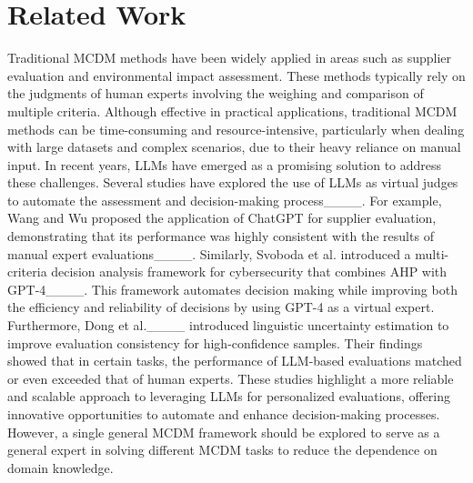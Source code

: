 \section{Related Work}
Traditional MCDM methods have been widely applied in areas such as supplier evaluation and environmental impact assessment. These methods typically rely on the judgments of human experts involving the weighing and comparison of multiple criteria. Although effective in practical applications, traditional MCDM methods can be time-consuming and resource-intensive, particularly when dealing with large datasets and complex scenarios, due to their heavy reliance on manual input. In recent years, LLMs have emerged as a promising solution to address these challenges. Several studies have explored the use of LLMs as virtual judges to automate the assessment and decision-making process____. For example, Wang and Wu proposed the application of ChatGPT for supplier evaluation, demonstrating that its performance was highly consistent with the results of manual expert evaluations____. Similarly, Svoboda et al. introduced a multi-criteria decision analysis framework for cybersecurity that combines AHP with GPT-4____. This framework automates decision making while improving both the efficiency and reliability of decisions by using GPT-4 as a virtual expert. Furthermore, Dong et al.____ introduced linguistic uncertainty estimation to improve evaluation consistency for high-confidence samples. Their findings showed that in certain tasks, the performance of LLM-based evaluations matched or even exceeded that of human experts. These studies highlight a more reliable and scalable approach to leveraging LLMs for personalized evaluations, offering innovative opportunities to automate and enhance decision-making processes. However, a single general MCDM framework should be explored to serve as a general expert in solving different MCDM tasks to reduce the dependence on domain knowledge.